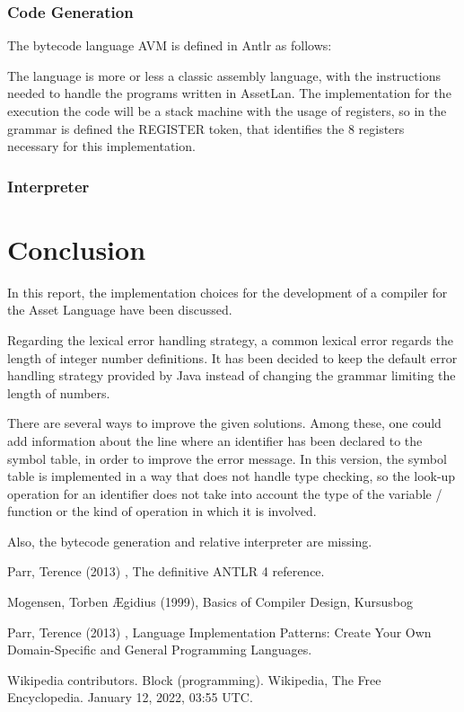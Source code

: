 \documentclass[11pt]{article} %
\begin{document}
\subsubsection{Code Generation}
The bytecode language AVM is defined in Antlr as follows:

The language is more or less a classic assembly language, with the instructions needed to handle the programs written in AssetLan. The implementation for the execution the code will be a stack machine with the usage of registers, so in the grammar is defined the REGISTER token, that identifies the $8$ registers  necessary for this implementation.

\subsubsection{Interpreter}

\section{Conclusion}
In this report, the implementation choices for the development of a compiler for the Asset Language have been discussed.

\medskip

Regarding the lexical error handling strategy, a common lexical error regards the length of integer number definitions. It has been decided to keep the default error handling strategy provided by Java instead of changing the grammar limiting the length of numbers.

\medskip

There are several ways to improve the given solutions. Among these, one could add information about the line where an identifier has been declared to the symbol table, in order to improve the error message. In this version, the symbol table is implemented in a way that does not handle type checking, so the look-up operation for an identifier does not take into account the type of the variable / function or the kind of operation in which it is involved.

\medskip

Also, the bytecode generation and relative interpreter are missing.

\clearpage

\begin{thebibliography}{9}
Parr, Terence (2013) , The definitive ANTLR 4 reference.

Mogensen, {Torben {\AE}gidius} (1999), Basics of Compiler Design, Kursusbog 

Parr, Terence (2013) , Language Implementation Patterns: Create Your Own Domain-Specific and General Programming Languages.

Wikipedia contributors. Block (programming). Wikipedia, The Free Encyclopedia. January 12, 2022, 03:55 UTC. 
\end{thebibliography}
\end{document}

